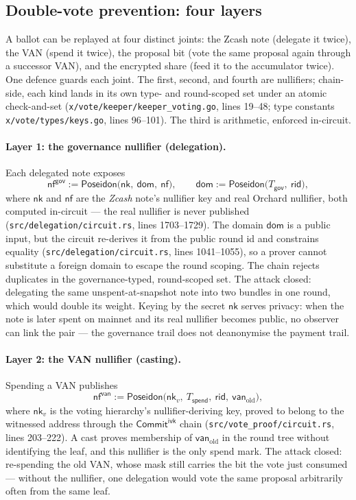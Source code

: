 \documentclass[11pt,a4paper]{article}
\theoremstyle{definition}
\newcommand{\nfsym}{\mathsf{nf}}
\newcommand{\CommitIvk}{\ensuremath{\mathsf{Commit}^{\mathsf{ivk}}}}
\newcommand{\nksym}{\ensuremath{\mathsf{nk}}}
\begin{document}
\subsection{Double-vote prevention: four layers}\label{sec:vote-layers}

A ballot can be replayed at four distinct joints: the Zcash note (delegate it
twice), the VAN (spend it twice), the proposal bit (vote the same proposal
again through a successor VAN), and the encrypted share (feed it to the
accumulator twice). One defence guards each joint. The first, second, and
fourth are nullifiers; chain-side, each kind lands in its own type- and
round-scoped set under an atomic check-and-set
(\texttt{x/vote/keeper/keeper\_voting.go}, lines 19--48; type constants
\texttt{x/vote/types/keys.go}, lines 96--101). The third is arithmetic,
enforced in-circuit.

\paragraph{Layer 1: the governance nullifier (delegation).} Each delegated
note exposes
\[
\nfsym^{\mathsf{gov}} := \mathsf{Poseidon}\bigl(\nksym,\ \mathsf{dom},\
\nfsym\bigr), \qquad
\mathsf{dom} := \mathsf{Poseidon}\bigl(T_{\mathsf{gov}},\ \mathsf{rid}\bigr),
\]
where $\nksym$ and $\nfsym$ are the \emph{Zcash} note's nullifier key and
real Orchard nullifier, both computed in-circuit --- the real nullifier is
never published (\texttt{src/delegation/circuit.rs}, lines 1703--1729). The
domain $\mathsf{dom}$ is a public input, but the circuit re-derives it from
the public round id and constrains equality
(\texttt{src/delegation/circuit.rs}, lines 1041--1055), so a prover cannot
substitute a foreign domain to escape the round scoping. The chain rejects
duplicates in the governance-typed, round-scoped set. The attack closed:
delegating the same unspent-at-snapshot note into two bundles in one round,
which would double its weight. Keying by the secret $\nksym$ serves privacy:
when the note is later spent on mainnet and its real nullifier becomes
public, no observer can link the pair --- the governance trail does not
deanonymise the payment trail.

\paragraph{Layer 2: the VAN nullifier (casting).} Spending a VAN publishes
\[
\nfsym^{\mathsf{van}} := \mathsf{Poseidon}\bigl(\nksym_{v},\
T_{\mathsf{spend}},\ \mathsf{rid},\ \mathsf{van}_{\mathrm{old}}\bigr),
\]
where $\nksym_{v}$ is the voting hierarchy's nullifier-deriving key, proved
to belong to the witnessed address through the \CommitIvk{} chain
(\texttt{src/vote\_proof/circuit.rs}, lines 203--222). A cast proves
membership of $\mathsf{van}_{\mathrm{old}}$ in the round tree without
identifying the leaf, and this nullifier is the only spend mark. The attack
closed: re-spending the old VAN, whose mask still carries the bit the vote
just consumed --- without the nullifier, one delegation would vote the same
proposal arbitrarily often from the same leaf.
\end{document}
